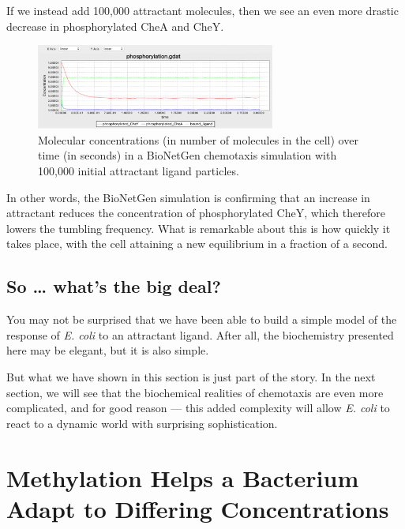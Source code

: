 If we instead add 100,000 attractant molecules, then we see an even more drastic decrease in phosphorylated CheA and CheY.

\begin{figure}[h]
\centering
\mySfFamily
\includegraphics[width = 0.7\textwidth]{../images/chemotaxis_tutorial7.png}
\caption{Molecular concentrations (in number of molecules in the cell) over time (in seconds) in a BioNetGen chemotaxis simulation with 100,000 initial attractant ligand particles.}
\label{fig:chemotaxis_tutorial7}
\end{figure}


In other words, the BioNetGen simulation is confirming that an increase in attractant reduces the concentration of phosphorylated CheY, which therefore lowers the tumbling frequency. What is remarkable about this is how quickly it takes place, with the cell attaining a new equilibrium in a fraction of a second.


\FloatBarrier
{}
{}
\subsection{So … what's the big deal?}

You may not be surprised that we have been able to build a simple model of the response of \textit{E. coli} to an attractant ligand. After all, the biochemistry presented here may be elegant, but it is also simple.

But what we have shown in this section is just part of the story. In the next section, we will see that the biochemical realities of chemotaxis are even more complicated, and for good reason --- this added complexity will allow \textit{E. coli} to react to a dynamic world with surprising sophistication.



\FloatBarrier
{}

\section{Methylation Helps a Bacterium Adapt to Differing Concentrations}
\label{sec:methylation}


